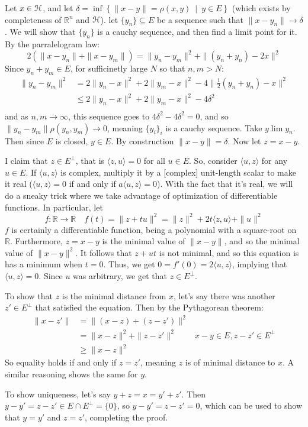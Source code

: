 \documentclass[oneside]{book}
\newcommand{\R}{\mathbb{R}}
\newcommand{\EH}{\EuScript{H}}
\newcommand{\sse}{\subseteq}
\newcommand{\rw}{\rightarrow}
\newcommand{\set}[2]{\left\{#1 \ \middle|\ #2\right\}}
\begin{document}
\begin{Proof}
Let $x \in \EH$, and let $\delta = \inf\set{ \|x-y\| = \rho(x,y)}{y \in E}$ (which exists by completeness of $\R^n$
and $\EH$). let $\{y_n\} \sse E$ be a sequence such that $\|x - y_n\| \rw \delta$. We will show that $\{y_n\}$ is
a cauchy sequence, and then find a limit point for it. By the parralelogram law:
\[
	2(\|x - y_n\| + \|x - y_m\|) = \|y_n - y_m\|^2 + \|(y_n + y_n) - 2x\|^2
\]
Since $y_n + y_m \in E$, for sufficinetly large $N$ so that $n,m > N$:
\begin{align*}
	\|y_n - y_m\|^2 &= 2\|y_n - x\|^2 + 2\|y_m - x\|^2 - 4\|\frac{1}{2}(y_n + y_n) - x\|^2\\
					&\le2\|y_n - x\|^2 + 2\|y_m - x\|^2 - 4\delta^2\\
\end{align*}
and as $n,m \rw \infty$, this sequence goes to $4\delta^2 - 4\delta^2 = 0$, and so $\|y_n - y_m\| \rho(y_n, y_m) \rw
0$, meaning $\{y_i\}_i$ is a cauchy sequence. Take $y \lim y_n$. Then since $E$ is closed, $y \in E$. By
construction $\|x-y\| = \delta$. Now let $z = x-y$.

I claim that $z \in E^{\perp}$, that is $\langle z,u \rangle = 0$ for all $u \in E$. So, consider $\langle u,z
\rangle$ for any $u \in E$. If $ \langle u,z \rangle$ is complex, multiply it by a [complex] unit-length scalar to make
it real ($\langle u,z \rangle = 0$ if and only if $a \langle u,z \rangle = 0$). With the fact that it's real, we
will do a sneaky trick where we take advantage of optimization of differentiable functions. In particular, let
\[
	f: \R \rw \R \quad f(t) = \|z + tu\|^2 = \|z\|^2 + 2t \langle z,u \rangle + \|u\|^2
\]
$f$ is certainly a differentiable function, being a polynomial with a square-root on $\R$. Furthermore, $z = x-y$ is
the minimal value of $\|x-y\|$, and so the minimal value of $\|x-y\|^2$. It follows that $z + ut$ is not minimal,
and so this equation is has a minimum when $t = 0$. Thus, we get $0 = f'(0) = 2 \langle u,z \rangle$, implying that
$ \langle u,z \rangle = 0$. Since $u$ was arbitrary, we get that $z \in E^\perp$.

To show that $z$ is the minimal distance from $x$, let's say there was another $z' \in E^\perp$ that satisfied the
equation. Then by the Pythagorean theorem:
\begin{align*}
	\|x-z'\| &= \|(x-z)+(z-z')\|^2\\
			 &= \|x-z\|^2 +\|z-z'\|^2 &x-y \in E, z-z' \in E^\perp\\
			 &\ge \|x-z\|^2
\end{align*}
So equality holds if and only if $z = z'$, meaning $z$ is of minimal distance to $x$. A similar reasoning shows the
same for $y$.

To show uniqueness, let's say $y + z = x = y' + z'$. Then $y - y' = z-z' \in E\cap E^\perp = \{0\}$, so $y-y' = z-z'
= 0$, which can be used to show that $y = y'$ and $z = z'$, completing the proof.
\end{Proof}
\end{document}
